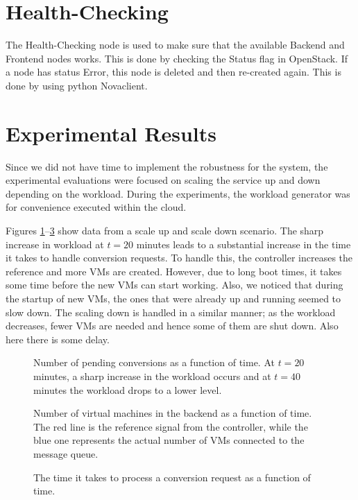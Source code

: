 \documentclass[a4paper, 10pt, english]{article}
\newlength\figureheight
\newlength\figurewidth
\begin{document}
\section{Health-Checking} \label{sec:HC}
The Health-Checking node is used to make sure that the available Backend and Frontend nodes works. This is done by checking the Status flag in OpenStack. If a node has status Error, this node is deleted and then re-created again. This is done by using python Novaclient.


\section{Experimental Results}
Since we did not have time to implement the robustness for the system, the experimental evaluations were focused on scaling the service up and down depending on the workload. During the experiments, the workload generator was for convenience executed within the cloud. 

Figures \ref{fig:conversionsPending}--\ref{fig:conversionTime} show data from a scale up and scale down scenario. The sharp increase in workload at $ t=20 $ minutes leads to a substantial increase in the time it takes to handle conversion requests. To handle this, the controller increases the reference and more VMs are created. However, due to long boot times, it takes some time before the new VMs can start working. Also, we noticed that during the startup of new VMs, the ones that were already up and running seemed to slow down. The scaling down is handled in a similar manner; as the workload decreases, fewer VMs are needed and hence some of them are shut down. Also here there is some delay.

\setlength{}
\setlength{}
\begin{figure}
	\centering
	
	\caption{Number of pending conversions as a function of time. At $ t=20 $ minutes, a sharp increase in the workload occurs and at $ t=40 $ minutes the workload drops to a lower level.}
	\label{fig:conversionsPending}
\end{figure}

\begin{figure}
	\centering
	
	\caption{Number of virtual machines in the backend as a function of time. The red line is the reference signal from the controller, while the blue one represents the actual number of VMs connected to the message queue. }
	\label{fig:numberOfVMs}
\end{figure}

\begin{figure}
	\centering
	
	\caption{The time it takes to process a conversion request as a function of time.}
	\label{fig:conversionTime}
\end{figure}
\end{document}
